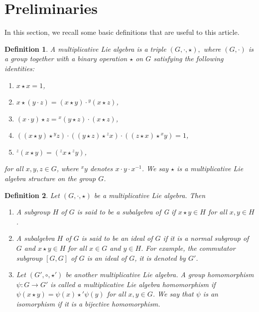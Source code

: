 \documentclass[10 pt,oneside,reqno,a4paper]{amsart}
\newtheorem{definition}{Definition}[section]
\numberwithin{equation}{section}
\begin{document}
\section{Preliminaries}
In this section, we recall some basic definitions that are useful to this article.   
\begin{definition}\cite{GJ}
	A multiplicative Lie algebra is a triple $ (G,\cdot,\star), $ where $ (G,\cdot) $ is a group together with a binary operation $ \star $ on $G$ satisfying the following identities: 
	\begin{enumerate}
		\item $ x\star x=1 $,  
		\item $ x\star(y\cdot z)=(x\star y)\cdot{^y(x\star z)} $, 
		\item $ (x\cdot y)\star z= {^x(y\star z)}\cdot (x\star z) $, 
		\item $ ((x\star y)\star {^yz})\cdot((y\star z)\star{^zx})\cdot((z\star x)\star{^xy})=1 $, 
		\item $ ^z(x\star y)=(^zx\star {^zy})$, 
	\end{enumerate}
for all $x,y,z\in G$, where $^xy$ denotes $x\cdot y\cdot x^{-1}$. We say $ \star $ is a multiplicative Lie algebra structure on the group $G$.
\end{definition}
\begin{definition}\cite{GJ, RS}
Let $(G,\cdot,\star)$ be a multiplicative Lie algebra. Then
\begin{enumerate}
\item A subgroup $H$ of $G$ is said to be a subalgebra of G if $x\star y \in H$ for all $x,y \in H$.

\item A subalgebra $H$ of $G$ is said to be an ideal of $G$ if it is a normal subgroup of $G$ and $x\star y \in H$ for all $x \in G$ and $y \in H$. For example, the commutator subgroup $[G, G]$ of $G$ is an ideal of $G$, it is denoted by $G'$. 




\item Let $(G',\circ , \star')$ be another multiplicative Lie algebra. A group homomorphism $\psi: G \to G'$ is called a multiplicative Lie algebra homomorphism if $\psi(x\star y) =\psi(x) \star ' \psi(y)$ for all $x, y \in G$. We say that $\psi$ is an isomorphism if it is a bijective homomorphism. 

\end{enumerate}
\end{definition}
\end{document}
